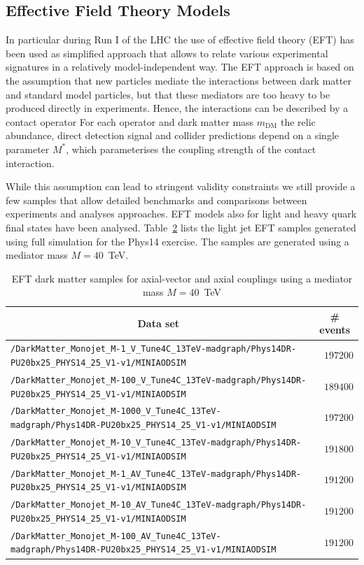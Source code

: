 \begin{table}[h!]
\clearpage

\subsection{Effective Field Theory Models}


In particular during Run I of the LHC the use of effective field theory (EFT) has been used as simplified approach that allows to relate
various experimental signatures in a relatively model-independent way. The EFT approach is based on the assumption
that new particles mediate the interactions between dark matter and standard model particles, but that these mediators are too heavy to be produced directly in experiments. 
Hence, the interactions can be described by a contact operator For each operator and dark matter mass $m_\textrm{DM}$ the relic abundance, direct detection signal
 and collider predictions depend on a single parameter $M^*$, which parameterises the coupling strength of the contact interaction. 

While this assumption can lead to stringent validity constraints we still provide a few samples that allow detailed benchmarks and comparisons between experiments and analyses approaches.
EFT models also for light and heavy quark final states have been analysed.
Table~\ref{tab:datasets_dm} lists the light jet EFT samples generated using full simulation for the Phys14 exercise. The samples are generated using a mediator mass $M=40$~TeV.

\begin{table}
    \centering
    \caption{EFT dark matter samples for axial-vector and axial couplings using a mediator mass $M=40$~TeV \label{tab:datasets_dm}}
    \begin{tabular}{lr}
      \hline\hline
      \multicolumn{1}{c}{Data set}&\multicolumn{1}{c}{\# events}\tabularnewline
      \hline
      {\footnotesize \verb!/DarkMatter_Monojet_M-1_V_Tune4C_13TeV-madgraph/Phys14DR-PU20bx25_PHYS14_25_V1-v1/MINIAODSIM!   } &$197200$\tabularnewline
      {\footnotesize \verb!/DarkMatter_Monojet_M-100_V_Tune4C_13TeV-madgraph/Phys14DR-PU20bx25_PHYS14_25_V1-v1/MINIAODSIM! } &$189400$\tabularnewline
      {\footnotesize \verb!/DarkMatter_Monojet_M-1000_V_Tune4C_13TeV-madgraph/Phys14DR-PU20bx25_PHYS14_25_V1-v1/MINIAODSIM!} &$197200$\tabularnewline
      {\footnotesize \verb!/DarkMatter_Monojet_M-10_V_Tune4C_13TeV-madgraph/Phys14DR-PU20bx25_PHYS14_25_V1-v1/MINIAODSIM!  } &$191800$\tabularnewline
      {\footnotesize \verb!/DarkMatter_Monojet_M-1_AV_Tune4C_13TeV-madgraph/Phys14DR-PU20bx25_PHYS14_25_V1-v1/MINIAODSIM!  } &$191200$\tabularnewline
      {\footnotesize \verb!/DarkMatter_Monojet_M-10_AV_Tune4C_13TeV-madgraph/Phys14DR-PU20bx25_PHYS14_25_V1-v1/MINIAODSIM! } &$191200$\tabularnewline
      {\footnotesize \verb!/DarkMatter_Monojet_M-100_AV_Tune4C_13TeV-madgraph/Phys14DR-PU20bx25_PHYS14_25_V1-v1/MINIAODSIM!} &$191200$\tabularnewline
\hline
\end{tabular}
\end{table}



\end{table}
